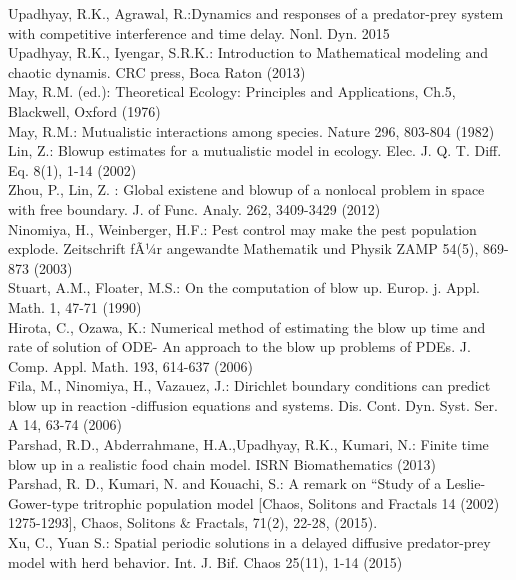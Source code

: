 \documentclass[10pt]{amsart}
\theoremstyle{definition}
\begin{document}
\begin{thebibliography}{3}
 Upadhyay, R.K., Agrawal, R.:Dynamics and responses of a predator-prey system with competitive interference and time delay. Nonl. Dyn. 2015\\

 Upadhyay, R.K., Iyengar, S.R.K.: Introduction to Mathematical modeling and chaotic dynamis. CRC press, Boca Raton (2013)\\

 May, R.M. (ed.): Theoretical Ecology: Principles and Applications, Ch.5, Blackwell, Oxford (1976)\\

 May, R.M.: Mutualistic interactions among species. Nature 296, 803-804 (1982)\\

  Lin, Z.: Blowup estimates for a mutualistic model in ecology. Elec. J. Q. T. Diff. Eq. 8(1), 1-14 (2002)\\

  Zhou, P., Lin, Z. : Global existene and blowup of a nonlocal problem in space with free boundary. J. of Func. Analy. 262, 3409-3429 (2012)\\ 

 Ninomiya, H., Weinberger, H.F.: Pest control may make the pest population explode. Zeitschrift fÃ¼r angewandte Mathematik und Physik ZAMP
54(5), 869-873 (2003)\\

 Stuart, A.M., Floater, M.S.: On the computation of blow up. Europ. j. Appl. Math. 1, 47-71 (1990)\\

 Hirota, C., Ozawa, K.: Numerical method of estimating the blow up time and rate of solution of ODE- An approach to the blow up problems of PDEs. J. Comp. Appl. Math. 193, 614-637 (2006)\\

 Fila, M., Ninomiya, H., Vazauez, J.: Dirichlet boundary conditions can predict blow up in reaction -diffusion equations and systems. Dis. Cont. Dyn. Syst. Ser. A 14, 63-74 (2006)\\

 Parshad, R.D., Abderrahmane, H.A.,Upadhyay, R.K., Kumari, N.: Finite time blow up in a realistic food chain model. ISRN Biomathematics (2013)\\

 Parshad, R. D., Kumari, N. and Kouachi, S.: A remark on  ``Study of a Leslie-Gower-type tritrophic population model [Chaos, Solitons and Fractals 14 (2002) 1275-1293], Chaos, Solitons $\&$ Fractals, 71(2), 22-28, (2015).
\\
 Xu, C., Yuan S.: Spatial periodic solutions in a delayed diffusive predator-prey model with herd behavior. Int. J. Bif. Chaos 25(11), 1-14 (2015)\\


\end{thebibliography}
\end{document}
